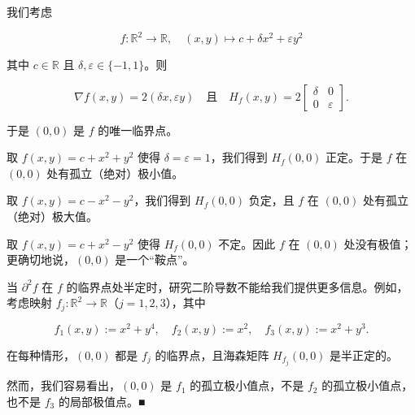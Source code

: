 \begin{example}

我们考虑

\[
f : \mathbb{R}^{2} \to \mathbb{R} , \quad (x, y) \mapsto c + \delta x^{2} + \varepsilon y^{2}
\]

其中 $ c \in \mathbb{R} $ 且 $ \delta, \varepsilon \in \{-1, 1\} $。则

\begin{equation*}
\nabla f(x, y) = 2(\delta x, \varepsilon y) \quad \text{且} \quad H_{f}(x, y) = 2\begin{bmatrix} \delta & 0 \\ 0 & \varepsilon \end{bmatrix} .
\end{equation*}

于是 $ (0, 0) $ 是 $ f $ 的唯一临界点。

\begin{items}
\item

取 $ f(x, y) = c + x^{2} + y^{2} $ 使得 $ \delta = \varepsilon = 1 $，我们得到 $ H_{f}(0, 0) $ 正定。于是 $ f $ 在 $ (0, 0) $ 处有孤立（绝对）极小值。

\item

取 $ f(x, y) = c - x^{2} - y^{2} $，我们得到 $ H_{f}(0, 0) $ 负定，且 $ f $ 在 $ (0, 0) $ 处有孤立（绝对）极大值。

\item

取 $ f(x, y) = c + x^{2} - y^{2} $ 使得 $ H_{f}(0, 0) $ 不定。因此 $ f $ 在 $ (0, 0) $ 处没有极值；更确切地说，$ (0, 0) $ 是一个“鞍点”。

\end{items}


\begin{items}
\item[（d）]

当 $ \partial^{2}f $ 在 $ f $ 的临界点处半定时，研究二阶导数不能给我们提供更多信息。例如，考虑映射 $ f_{j} : \mathbb{R}^{2} \to \mathbb{R} $（$ j = 1, 2, 3 $），其中

\[
f_{1}(x, y) := x^{2} + y^{4} , \quad f_{2}(x, y) := x^{2} , \quad f_{3}(x, y) := x^{2} + y^{3} .
\]

在每种情形，$ (0, 0) $ 都是 $ f_{j} $ 的临界点，且海森矩阵 $ H_{f_{j}}(0, 0) $ 是半正定的。

\end{items}


然而，我们容易看出，$ (0, 0) $ 是 $ f_{1} $ 的孤立极小值点，不是 $ f_{2} $ 的孤立极小值点，也不是 $ f_{3} $ 的局部极值点。\nobreak\hspace{0.35em}■

\end{example}

